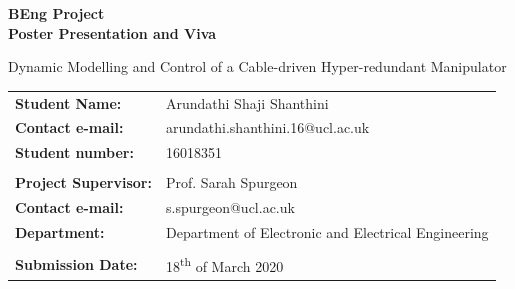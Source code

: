 \documentclass[a4paper,12pt]{article}
\author{Arundathi Shaji Shanthini}
\begin{document}
\begin{titlepage}
    \setlength{\voffset}{-1.6in}
    \noindent \noindent {}
    
    \vspace{15mm}
    
    \begin{center}
        {\LARGE \textbf{BEng Project}}\\
        \vspace{4mm}
        {\Huge \textbf{Poster Presentation and Viva}}
    \end{center}
    
    \vspace{10mm}
    
    \begin{center}
    \begin{spacing}{1.8}
    {\LARGE
    Dynamic Modelling and Control of a Cable-driven Hyper-redundant Manipulator}
    \end{spacing}
    \end{center}
    
    \vspace{18mm}
    
     \begin{tabular}{ll}
    	\textbf{Student Name:}  & \hspace{4mm} Arundathi Shaji Shanthini \\
    	\textbf{Contact e-mail:} & \hspace{4mm} arundathi.shanthini.16@ucl.ac.uk \\
    	\textbf{Student number:} & \hspace{4mm} 16018351 \\ \\ 
    	\textbf{Project Supervisor:}  & \hspace{4mm} Prof. Sarah Spurgeon \\
    	\textbf{Contact e-mail:}  & \hspace{4mm} s.spurgeon@ucl.ac.uk \\
    	\textbf{Department:} & \hspace{4mm} Department of Electronic and Electrical Engineering\\ \\ 
    	\textbf{Submission Date:} & \hspace{4mm} 18\textsuperscript{th} of March 2020
    \end{tabular}
\end{titlepage}
\end{document}
